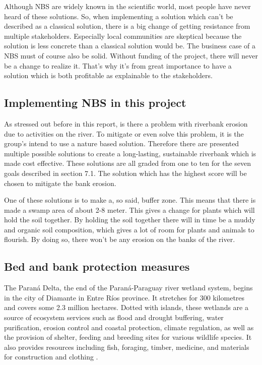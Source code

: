 Although NBS are widely known in the scientific world, most people have never heard of these solutions. So, when implementing a solution which can't be described as a classical solution, there is a big change of getting resistance from multiple stakeholders. Especially local communities are skeptical because the solution is less concrete than a classical solution would be. The business case of a NBS must of course also be solid. Without funding of the project, there will never be a change to realize it. That's why it's from great importance to have a solution which is both profitable as explainable to the stakeholders. 

\subsection{Implementing NBS in this project}

As stressed out before in this report, is there a problem with riverbank erosion due to activities on the river. To mitigate or even solve this problem, it is the group's intend to use a nature based solution. Therefore there are presented multiple possible solutions to create a long-lasting, sustainable riverbank which is made cost effective. These solutions are all graded from one to ten for the seven goals described in section 7.1. The solution which has the highest score will be chosen to mitigate the bank erosion.

One of these solutions is to make a, so said, buffer zone. This means that there is made a swamp area of about 2-8 meter. This gives a change for plants which will hold the soil together. By holding the soil together there will in time be a muddy and organic soil composition, which gives a lot of room for plants and animals to flourish. By doing so, there won't be any erosion on the banks of the river. 


\subsection{Bed and bank protection measures}
The Paraná Delta, the end of the Paraná-Paraguay river wetland system, begins in the city of Diamante in Entre Ríos province. It stretches for 300 kilometres and covers some 2.3 million hectares. Dotted with islands, these wetlands are a source of ecosystem services such as flood and drought buffering, water purification, erosion control and coastal protection, climate regulation, as well as the provision of shelter, feeding and breeding sites for various wildlife species. It also provides resources including fish, foraging, timber, medicine, and materials for construction and clothing \autocite{hibaParanaRiverEcological2024}.

